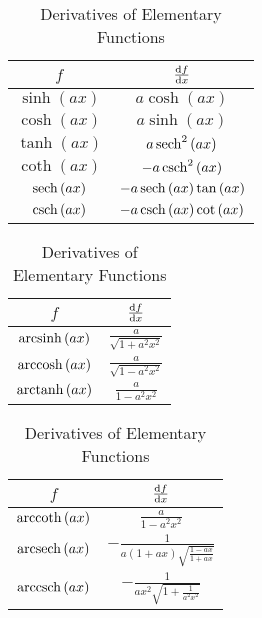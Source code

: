 \documentclass{article}
\begin{document}
\begin{table}[H]
    \renewcommand*{\arraystretch}{1.5}
    \centering
    \hspace*{-1cm}
    \begin{tabular}{c c}
        \toprule
        \(f\)                        & \(\dv{f}{x}\)                                         \\
        \midrule
        \(\sinh{\left( ax \right)}\) & \(a\cosh{\left( ax \right)}\)                         \\
        \(\cosh{\left( ax \right)}\) & \(a\sinh{\left( ax \right)}\)                         \\
        \(\tanh{\left( ax \right)}\) & \(a\sech^2{\left( ax \right)}\)                       \\
        \(\coth{\left( ax \right)}\) & \(-a\csch^2{\left( ax \right)}\)                      \\
        \(\sech{\left( ax \right)}\) & \(-a\sech{\left( ax \right)}\tan{\left( ax \right)}\) \\
        \(\csch{\left( ax \right)}\) & \(-a\csch{\left( ax \right)}\cot{\left( ax \right)}\) \\[5pt]
        \bottomrule
    \end{tabular}
    \begin{tabular}{c c}
        \toprule
        \(f\)                           & \(\dv{f}{x}\)                               \\
        \midrule
        \(\operatorname{arcsinh}{\left( ax \right)}\) & \(\displaystyle \frac{a}{\sqrt{1+a^2x^2}}\) \\[8pt]
        \(\operatorname{arccosh}{\left( ax \right)}\) & \(\displaystyle \frac{a}{\sqrt{1-a^2x^2}}\) \\[8pt]
        \(\operatorname{arctanh}{\left( ax \right)}\) & \(\displaystyle \frac{a}{1-a^2x^2}\)        \\[8pt]
        \bottomrule
    \end{tabular}
    \begin{tabular}{c c}
        \toprule
        \(f\)                           & \(\dv{f}{x}\)                                                             \\
        \midrule
        \(\operatorname{arccoth}{\left( ax \right)}\) & \(\displaystyle  \frac{a}{1-a^2x^2}\)                                     \\[8pt]
        \(\operatorname{arcsech}{\left( ax \right)}\) & \(\displaystyle -\frac{1}{a\left( 1+ax \right)\sqrt{\frac{1-ax}{1+ax}}}\) \\[8pt]
        \(\operatorname{arccsch}{\left( ax \right)}\) & \(\displaystyle -\frac{1}{ax^2\sqrt{1+\frac{1}{a^2x^2}}}\)                \\[8pt]
        \bottomrule
    \end{tabular}
    \hspace*{-1cm}
    \caption{Derivatives of Elementary Functions}
\end{table}
\end{document}
